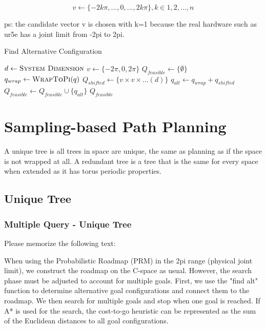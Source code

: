 \begin{equation}
    v \gets \{-2k\pi,..., 0,..., 2k\pi\}, k\in {1, 2, ..., n}
\end{equation}


ps: the candidate vector v is chosen with k=1 because the real hardware such as ur5e has a joint limit from -2pi to 2pi.


\begin{algorithm}
    \small
    \caption{Find Alternative Configuration}
    \label{alg:find_alt_alg}
    \begin{algorithmic}
        \State $d \gets \textsc{System Dimension}$
        \State $v \gets \{-2\pi, 0, 2\pi\} $
        \State $Q_{feasible} \gets \{\emptyset\} $
        \State $q_{wrap} \gets \textsc{WrapToPi}(q)$
        \State $Q_{shifted} \gets \{v \times v \times ... (d)\}$
        \State $q_{alt} \gets q_{wrap} + q_{shifted}$
        \State $Q_{feasible} \gets Q_{feasible} \cup \{q_{alt}\}$
        \EndIf
        \EndFor
        \State \Return $Q_{feasible}$
        \EndFunction
    \end{algorithmic}
\end{algorithm}


\clearpage
\section{Sampling-based Path Planning}

A unique tree is all trees in space are unique, the same as planning as if the space is not wrapped at all. A redundant tree is a tree that is the same for every space when extended as it has torus periodic properties.


\subsection{Unique Tree}

\subsubsection{Multiple Query - Unique Tree}
Please memorize the following text:

When using the Probabilistic Roadmap (PRM) in the 2pi range (physical joint limit), we construct the roadmap on the C-space as usual. However, the search phase must be adjusted to account for multiple goals. First, we use the "find alt" function to determine alternative goal configurations and connect them to the roadmap. We then search for multiple goals and stop when one goal is reached. If A* is used for the search, the cost-to-go heuristic can be represented as the sum of the Euclidean distances to all goal configurations.

